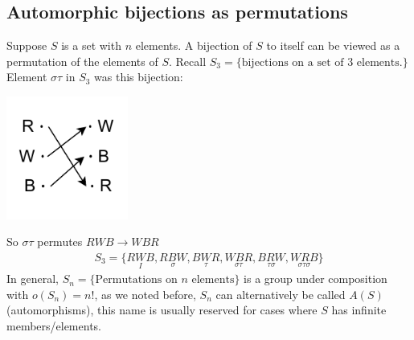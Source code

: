 \subsection*{Automorphic bijections as permutations}
Suppose $S$ is a set with $n$ elements. A bijection of $S$ to itself can be viewed as a permutation of the elements of $S$. Recall $S_3=\{\text{bijections on a set of $3$ elements.}\}$\steezybreak\\
Element $\sigma\tau$ in $S_3$ was this bijection:\\
\begin{center}
    \includegraphics[width=0.3\textwidth]{Figures/Permutations_Cayley_1.pdf} 
\end{center}
So $\sigma \tau$ permutes $RWB \rightarrow WBR$\\
\begin{align}
    S_3= \{\underset{I}{RWB},\underset{\sigma}{RBW},\underset{\tau}{BWR},\underset{\sigma\tau}{WBR},\underset{\tau\sigma}{BRW},\underset{\sigma\tau\sigma}{WRB}\} \nonumber
\end{align}
In general, $S_n= \{\text{Permutations on $n$ elements}\}$ is a group under composition with $o(S_n)=n!$, as we noted before, $S_n$ can alternatively be called $A(S)$ (automorphisms), this name is usually reserved for cases where $S$ has infinite members/elements.
\newpage

